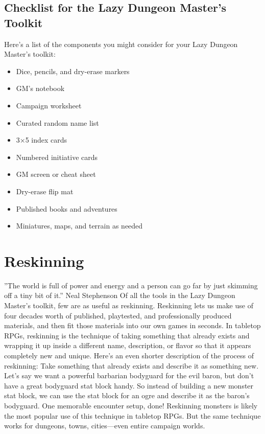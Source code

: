 \documentclass[10pt,a4paper,twoside,bg=print,twocolumn,openany,nodeprecatedcode]{dndbook}
\begin{document}
\subsection{Checklist for the Lazy Dungeon Master's Toolkit}
Here's a list of the components you might consider for your Lazy Dungeon Master's toolkit:

\begin{itemize}
\item Dice, pencils, and dry-erase markers
\item GM's notebook
\item Campaign worksheet
\item Curated random name list
\item 3×5 index cards
\item Numbered initiative cards
\item GM screen or cheat sheet
\item Dry-erase flip mat
\item Published books and adventures
\item Miniatures, maps, and terrain as needed
\end{itemize}

\section{Reskinning}
\DndQuote%
{}
{''The world is full of power and energy and a person can go far by just skimming off a tiny bit of it.''}
{Neal Stephenson}
Of all the tools in the Lazy Dungeon Master's toolkit, few are as useful as reskinning. Reskinning lets us make use of four decades worth of published, playtested, and professionally produced materials, and then fit those materials into our own games in seconds.
In tabletop RPGs, reskinning is the technique of taking something that already exists and wrapping it up inside a different name, description, or flavor so that it appears completely new and unique.
Here's an even shorter description of the process of reskinning:
Take something that already exists and describe it as something new.
Let's say we want a powerful barbarian bodyguard for the evil baron, but don't have a great bodyguard stat block handy. So instead of building a new monster stat block, we can use the stat block for an ogre and describe it as the baron's bodyguard. One memorable encounter setup, done!
Reskinning monsters is likely the most popular use of this technique in tabletop RPGs. But the same technique works for dungeons, towns, cities—even entire campaign worlds.
\end{document}
